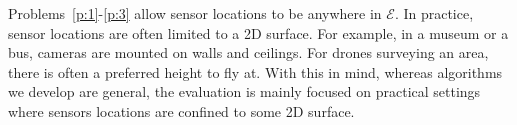 Problems~\ref{p:1}-\ref{p:3} allow sensor locations to be anywhere in $\mathcal E$. 
In practice, sensor locations are often limited to a 2D surface. 
For example, in a museum or a bus, cameras are mounted on walls and ceilings. 
For drones surveying an area, there is often a preferred height to fly at. 
With this in mind, whereas algorithms we develop are general, 
the evaluation is mainly focused on practical settings where sensors locations are confined to some 2D surface.
